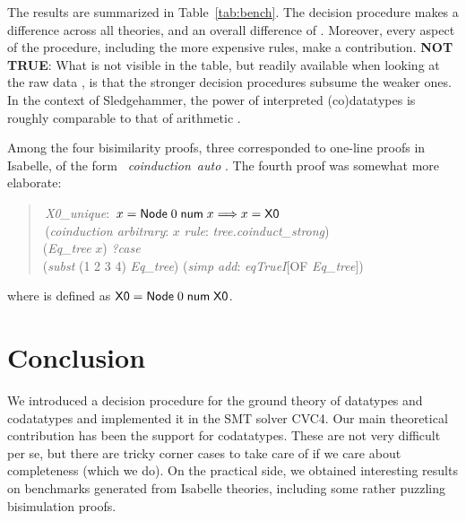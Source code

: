 The results are summarized in Table~\ref{tab:bench}. The decision procedure
makes a difference across all theories, and an overall difference of
. Moreover, every aspect of the procedure, including the more
expensive rules, make a contribution. \textbf{NOT TRUE}: What is not visible in the table, but
readily available when looking at the raw data \cite{our-eval-data}, is that
the stronger decision procedures subsume the weaker ones. In the context of
Sledgehammer, the power of interpreted (co)datatypes is roughly
comparable to that of arithmetic \cite{blanchette-et-al-2013-smt}.


Among the four bisimilarity proofs, three corresponded to one-line
proofs in Isabelle, of the form ~\textit{coinduction}~\textit{auto}
\cite{blanchette-et-al-2014-impl}. The fourth proof was somewhat more elaborate:
%
\begin{quote}
 \,\textit{X0\_unique}: \,$x = \textsf{Node}\;0\;\textsf{num}\; x \Longrightarrow x = \textsf{X0}$ \\
 \,(\textit{coinduction arbitrary}: $x$ \textit{rule}: \textit{tree.coinduct\_strong}) \\
\noindent\hbox{}\quad  {} (\textit{Eq\_tree} $x$)  \textit{?case} \\
\noindent\hbox{}\qquad  {} (\textit{subst} (1 2 3 4) \textit{Eq\_tree}) (\textit{simp add}: \textit{eqTrueI}[OF \textit{Eq\_tree}]) \\
\end{quote}
%
\noindent
where  is defined as $\textsf{X0} =
\textsf{Node}\;0\;\textsf{num}\;\textsf{X0}$.

\section{Conclusion}
\label{sec:conclusion}

We introduced a decision procedure for the ground theory of datatypes and
codatatypes and implemented it in the SMT solver CVC4. Our main theoretical
contribution has been the support for codatatypes. These are not very
difficult per se, but there are tricky corner cases to take care of if we care
about completeness (which we do).
On the practical side, we obtained
interesting results on benchmarks generated from Isabelle theories, including
some rather
puzzling bisimulation proofs.

